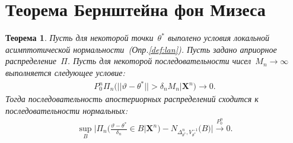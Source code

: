 \documentclass[12pt, twoside]{article}
\newtheorem{theorem}{Теорема}
\numberwithin{equation}{section}
\begin{document}
\section{Теорема Бернштейна фон Мизеса}
\begin{theorem}
Пусть для некоторой точки~$\theta^*$ выполено условия локальной асимптотической нормальности~(Опр.\ref{def:lan}).  Пусть задано априорное распределение~$\Pi$. Пусть для некоторой последовательности чисел~$M_n \to \infty$ выполняется следующее условие:
\[
\label{th:1}
\begin{aligned}
P_0^{n}\Pi_n\bigr(||\vartheta-\theta^*||>\delta_nM_n|\textbf{X}^n\bigr) \to 0.
\end{aligned}
\]
Тогда последовательность апостериорных распределений сходится к последовательности нормальных:
\[
\begin{aligned}
\sup_{B}\bigr|\Pi_{n}\bigr(\frac{\vartheta-\theta^*}{\delta_n}\in B|\textbf{X}^n\bigr)  - N_{\Delta^n_{\theta^*}, V^{-1}_{\theta^*}}\bigr(B\bigr)\bigr|  \overset{P_0^{n}}{\to} 0.
\end{aligned}
\]
\end{theorem}
\end{document}

